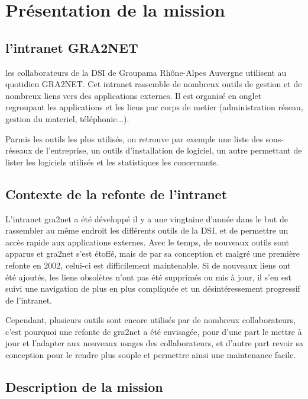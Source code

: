 \chapter{Présentation de la mission}
\thispagestyle{fancy}

\section{l'intranet GRA2NET}

les collaborateurs de la DSI de Groupama Rhône-Alpes Auvergne utilisent au
quotidien GRA2NET. Cet intranet rassemble de nombreux outils de
gestion et de nombreux liens vers des applications externes. Il est
organisé en onglet regroupant les applications et les liens par corps
de metier (administration réseau, gestion du materiel, téléphonie...).

Parmis les outils les plus utilisés, on retrouve par exemple une liste
des sous-réseaux de l'entreprise, un outils d'installation de
logiciel, un autre permettant de lister les logiciels utilisés et les
statistiques les concernants.


\section{Contexte de la refonte de l'intranet}

L’intranet gra2net a été développé il y a une vingtaine d’année dans
le but de rassembler au même endroit les différents outils de la DSI,
et de permettre un accès rapide aux applications externes. Avec le
temps, de nouveaux outils sont apparus et gra2net s’est étoffé, mais
de par sa conception et malgré une première refonte en 2002, celui-ci
est difficilement maintenable. Si de nouveaux liens ont été ajoutés,
les liens obsolètes n’ont pas été supprimés ou mis à jour, il s’en est
suivi une navigation de plus en plus compliquée et un désintéressement
progressif de l’intranet.

Cependant, plusieurs outils sont encore utilisés par de nombreux
collaborateurs, c’est pourquoi une refonte de gra2net a été envisagée,
pour d’une part le mettre à jour et l’adapter aux nouveaux usages des
collaborateurs, et d’autre part revoir sa conception pour le rendre
plus souple et permettre ainsi une maintenance facile.


\section{Description de la mission}

